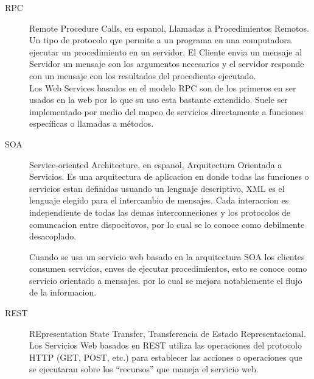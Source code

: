 \begin{description}
  \item[RPC] Remote Procedure Calls, en espanol, Llamadas a Procedimientos Remotos. Un tipo de protocolo qye permite a un programa en una computadora ejecutar un procedimiento en un servidor. El Cliente envia un mensaje al Servidor un mensaje con los argumentos necesarios y el servidor responde con un mensaje con los resultados del procediento ejecutado.\\

  Los Web Services basados en el modelo RPC son de los primeros en ser usados en la web por lo que su uso esta bastante extendido. Suele ser implementado por medio del mapeo de servicios directamente a funciones específicas o llamadas a métodos.


  \item[SOA] Service-oriented Architecture, en espanol, Arquitectura Orientada a Servicios.
Es una arquitectura de aplicacion en donde todas las funciones o servicios estan definidas usuando un lenguaje descriptivo, XML es el lenguaje elegido para el intercambio de mensajes. Cada interaccion es independiente de todas las demas interconneciones y los protocolos de comuncacion entre dispocitovos, por lo cual se lo conoce como debilmente desacoplado.

Cuando se usa un servicio web basado en la arquitectura SOA los clientes consumen servicios, enves de ejecutar procedimientos, esto se conoce como servicio orientado a mensajes. por lo cual se mejora notablemente el flujo de la informacion.


  \item[REST] REpresentation State Transfer, Transferencia de Estado Representacional.
  Los Servicios Web basados en REST utiliza las operaciones del protocolo HTTP (GET, POST, etc.) para establecer las acciones o operaciones que se ejecutaran sobre los ``recursos'' que maneja el servicio web.

\end{description}

